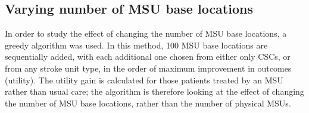 \subsection{Varying number of MSU base locations}

In order to study the effect of changing the number of MSU base locations, a greedy algorithm was used. In this method, 100 MSU base locations are sequentially added, with each additional one chosen from either only CSCs, or from any stroke unit type, in the order of maximum improvement in outcomes (utility). The utility gain is calculated for those patients treated by an MSU rather than usual care; the algorithm is therefore looking at the effect of changing the number of MSU base locations, rather than the number of physical MSUs.